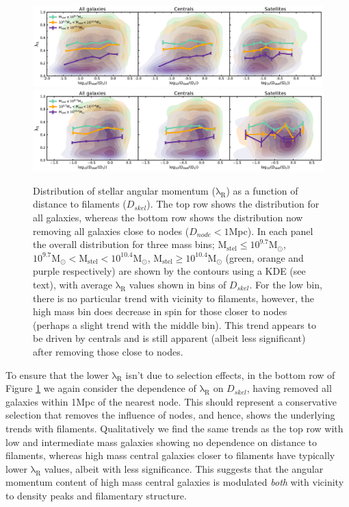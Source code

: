 \begin{figure}
    \centering\includegraphics[width=\linewidth]{thesis/latex/cw_spin/lambdaR_dskel_mass_split_3sigma.pdf} \\
    \centering\includegraphics[width=\linewidth]{thesis/latex/cw_spin/lambdaR_dskel_no_node_mass_split_3sigma.pdf}
    \caption{Distribution of stellar angular momentum ($\mathrm{\lambda_R}$) as a function of distance to filaments ($D_{skel}$). The top row shows the distribution for all galaxies, whereas the bottom row shows the distribution now removing all galaxies close to nodes ($D_{node} < 1$Mpc). In each panel the overall distribution for three mass bins; $\mathrm{M_{stel} \leq 10^{9.7} M_{\odot}}$, $\mathrm{10^{9.7}M_{\odot} < M_{stel} < 10^{10.4}M_{\odot}}$, $\mathrm{M_{stel} \geq 10^{10.4}M_{\odot}}$ (green, orange and purple respectively) are shown by the contours using a KDE (see text), with average $\mathrm{\lambda_R}$ values shown in bins of $D_{skel}$. For the low bin, there is no particular trend with vicinity to filaments, however, the high mass bin does decrease in spin for those closer to nodes (perhaps a slight trend with the middle bin). This trend appears to be driven by centrals and is still apparent (albeit less significant) after removing those close to nodes.}
\label{fig:lambdaR_dskel}
\end{figure} 

To ensure that the lower $\mathrm{\lambda_R}$ isn't due to selection effects, in the bottom row of Figure \ref{fig:lambdaR_dskel} we again consider the dependence of $\mathrm{\lambda_R}$ on $D_{skel}$, having removed all galaxies within 1Mpc of the nearest node. This should represent a conservative selection that removes the influence of nodes, and hence, shows the underlying trends with filaments. Qualitatively we find the same trends as the top row with low and intermediate mass galaxies showing no dependence on distance to filaments, whereas high mass central galaxies closer to filaments have typically lower $\mathrm{\lambda_R}$ values, albeit with less significance. This suggests that the angular momentum content of high mass central galaxies is modulated \textit{both} with vicinity to density peaks and filamentary structure. 

